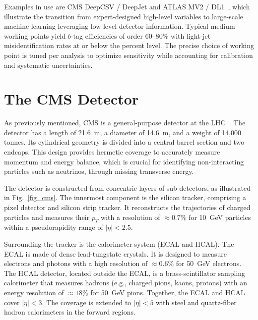 Examples in use are CMS DeepCSV / DeepJet and ATLAS MV2 / DL1~\parencite{CMS_DeepTau,ATLAS:2022fgo}, which illustrate the transition from expert-designed high-level variables to large-scale machine learning leveraging low-level detector information. Typical medium working points yield $b$-tag efficiencies of order 60–80\% with light-jet misidentification rates at or below the percent level. The precise choice of working point is tuned per analysis to optimize sensitivity while accounting for calibration and systematic uncertainties.

\section{The CMS Detector}

As previously mentioned, CMS is a general-purpose detector at the LHC~\parencite{CMS_2008}. The detector has a length of 21.6~m, a diameter of 14.6~m, and a weight of 14,000 tonnes. Its cylindrical geometry is divided into a central barrel section and two endcaps. This design provides hermetic coverage to accurately measure momentum and energy balance, which is crucial for identifying non-interacting particles such as  neutrinos, through missing transverse energy.



The detector is constructed from concentric layers of sub-detectors, as illustrated in Fig.~\ref{fig_cms}. The innermost component is the silicon tracker, comprising a pixel detector and silicon strip tracker. It reconstructs the trajectories of charged particles and measures their $p_T$ with a resolution of $\approx 0.7\%$ for 10~GeV particles within a pseudorapidity range of $|\eta| < 2.5$.

Surrounding the tracker is the calorimeter system (ECAL and HCAL). The ECAL is made of dense lead-tungstate crystals. It is designed to measure electrons and photons with a high resolution of $\approx 0.6\%$ for 50~GeV electrons. The HCAL detector, located outside the ECAL, is a brass-scintillator sampling calorimeter that measures hadrons (e.g., charged pions, kaons, protons) with an energy resolution of $\approx 18\%$ for 50~GeV pions. Together, the ECAL and HCAL cover $|\eta| < 3$. The coverage is extended to $|\eta| < 5$ with steel and quartz-fiber hadron calorimeters in the forward regions.


